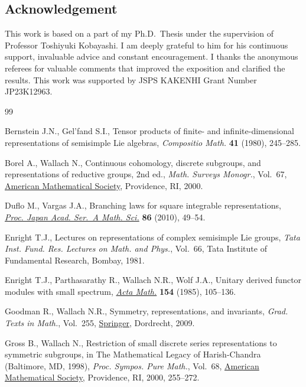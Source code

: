 \documentclass[pdftex]{sigma}
\numberwithin{equation}{section}
\theoremstyle{definition}
\begin{document}
\subsection*{Acknowledgement}

This work is based on a part of my Ph.D.\ Thesis under the supervision of Professor Toshiyuki Kobayashi.
I am deeply grateful to him for his continuous support, invaluable advice and constant encouragement.
I thanks the anonymous referees for valuable comments that improved the exposition and clarified the results.
This work was supported by JSPS KAKENHI Grant Number JP23K12963.

\begin{thebibliography}{99}
\footnotesize\itemsep=0pt

Bernstein J.N., Gel'fand S.I., Tensor products of finite- and
 infinite-dimensional representations of semisimple {L}ie algebras,
 \textit{Compositio Math.} \textbf{41} (1980), 245--285.

Borel A., Wallach N., Continuous cohomology, discrete subgroups, and
 representations of reductive groups, 2nd ed., \textit{Math. Surveys Monogr.}, Vol.~67, \href{https://doi.org/10.1090/surv/067}{American Mathematical Society}, Providence, RI, 2000.

Duflo M., Vargas J.A., Branching laws for square integrable representations,
 \href{https://doi.org/10.3792/pjaa.86.49}{\textit{Proc. Japan Acad. Ser.~A
 Math. Sci.}} \textbf{86} (2010), 49--54.

Enright T.J., Lectures on representations of complex semisimple {L}ie groups,
 \textit{Tata Inst. Fund. Res. Lectures on Math. and Phys.}, Vol.~66, Tata
 Institute of Fundamental Research, Bombay, 1981.

Enright T.J., Parthasarathy R., Wallach N.R., Wolf J.A., Unitary derived
 functor modules with small spectrum,
 \href{https://doi.org/10.1007/BF02392820}{\textit{Acta Math.}} \textbf{154}
 (1985), 105--136.

Goodman R., Wallach N.R., Symmetry, representations, and invariants,
 \textit{Grad. Texts in Math.}, Vol.~255,
 \href{https://doi.org/10.1007/978-0-387-79852-3}{Springer}, Dordrecht, 2009.

Gross B., Wallach N., Restriction of small discrete series representations to
 symmetric subgroups, in The Mathematical Legacy of {H}arish-{C}handra
 ({B}altimore, {MD}, 1998), \textit{Proc. Sympos. Pure Math.}, Vol.~68,
 \href{https://doi.org/10.1090/pspum/068/1767899}{American Mathematical
 Society}, Providence, RI, 2000, 255--272.


\end{thebibliography}
\end{document}
